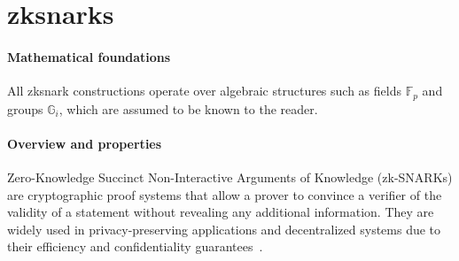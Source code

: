 \section{\acrshort{zksnark}s}
\label{sec:zksnarks}


\paragraph{Mathematical foundations}
All \acrshort{zksnark} constructions operate over algebraic structures such as fields $\mathbb{F}_p$ and groups $\mathbb{G}_i$, which are assumed to be known to the reader.

\paragraph{Overview and properties}
Zero-Knowledge Succinct Non-Interactive Arguments of Knowledge (zk-SNARKs) are cryptographic proof systems that allow a prover to convince a verifier of the validity of a statement without revealing any additional information. They are widely used in privacy-preserving applications and decentralized systems due to their efficiency and confidentiality guarantees~\cite{liang2025, nitulescu2020zk}.

